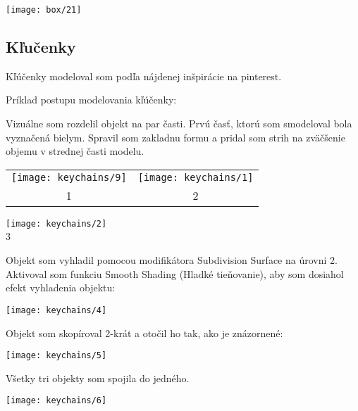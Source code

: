         \begin{center}
          \texttt{[image: box/21]}
        \end{center}
      \subsection{Kľučenky}

        Kľúčenky modeloval som podľa nájdenej inšpirácie na pinterest.

        Príklad postupu modelovania kľúčenky:

        Vizuálne som rozdelil objekt na par časti. Prvú časť, ktorú som smodeloval bola vyznačená bielym. Spravil som zakladnu formu a pridal som strih na zväčšenie objemu v strednej časti modelu. \\

        \begin{tabular}{c c}
          \texttt{[image: keychains/9]} & \texttt{[image: keychains/1]} \\
          1 & 2 \\
        \end{tabular}

        \begin{center}
          \texttt{[image: keychains/2]} \\
          3
        \end{center}

        Objekt som vyhladil pomocou modifikátora Subdivision Surface na úrovni 2. Aktivoval som funkciu Smooth Shading (Hladké tieňovanie), aby som dosiahol efekt vyhladenia objektu: \\
        \begin{center}
          \texttt{[image: keychains/4]}
        \end{center}

        Objekt som skopíroval 2-krát a otočil ho tak, ako je znázornené: \\
        \begin{center}
          \texttt{[image: keychains/5]}
        \end{center}

        Všetky tri objekty som spojila do jedného. \\
        \begin{center}
          \texttt{[image: keychains/6]}
        \end{center}

